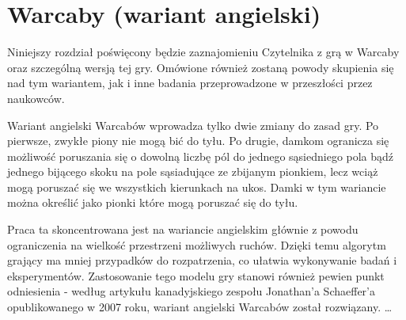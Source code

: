 \chapter{Warcaby (wariant angielski)}
\thispagestyle{chapterBeginStyle}
\label{rozdzial1}

{\color{dgray}
Niniejszy rozdział poświęcony będzie zaznajomieniu Czytelnika z grą w Warcaby oraz szczególną wersją tej gry. Omówione również zostaną powody skupienia się nad tym wariantem, jak i inne badania przeprowadzone w przeszłości przez naukowców.
}

Wariant angielski Warcabów wprowadza tylko dwie zmiany do zasad gry. Po pierwsze, zwykłe piony nie mogą bić do tyłu. Po drugie, damkom ogranicza się możliwość poruszania się o dowolną liczbę pól do jednego sąsiedniego pola bądź jednego bijącego skoku na pole sąsiadujące ze zbijanym pionkiem, lecz wciąż mogą poruszać się we wszystkich kierunkach na ukos. Damki w tym wariancie można określić jako pionki które mogą poruszać się do tyłu.

Praca ta skoncentrowana jest na wariancie angielskim głównie z powodu ograniczenia na wielkość przestrzeni możliwych ruchów. Dzięki temu algorytm grający ma mniej przypadków do rozpatrzenia, co ułatwia wykonywanie badań i eksperymentów. Zastosowanie tego modelu gry stanowi również pewien punkt odniesienia - według artykułu kanadyjskiego zespołu Jonathan'a Schaeffer'a opublikowanego w 2007 roku, wariant angielski Warcabów został rozwiązany. \ldots



